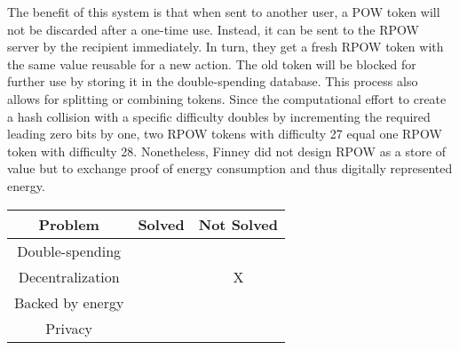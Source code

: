 The benefit of this system is that when sent to another user, a POW token will not be discarded after a one-time use.
Instead, it can be sent to the RPOW server by the recipient immediately.
In turn, they get a fresh RPOW token with the same value reusable for a new action.
The old token will be blocked for further use by storing it in the double-spending database.
This process also allows for splitting or combining tokens.
Since the computational effort to create a hash collision with a specific difficulty doubles by incrementing the required leading zero bits by one, two RPOW tokens with difficulty 27 equal one RPOW token with difficulty 28. \cite{finney2004}
Nonetheless, Finney did not design RPOW as a store of value but to exchange proof of energy consumption and thus digitally represented energy. \cite{wirdum_5_2018}

\begin{center}
	\begin{tabular}{|c c c|} 
	\hline
	Problem & Solved & Not Solved \\ [0.5ex] 
	\hline
	Double-spending & \checkmark  & \\ [0.5ex] 
	\hline
	Decentralization & & X \\ [0.5ex] 
	\hline
	Backed by energy & \checkmark & \\ [0.5ex] 
	\hline
	Privacy & \checkmark &  \\ [0.5ex]
	\hline
	\end{tabular}
\end{center}